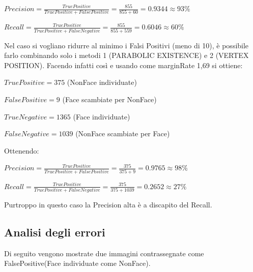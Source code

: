 \documentclass[
  italian,
]{article}
\begin{document}
\(Precision = \frac{TruePositive}{TruePositive + FalsePositive} = \frac{855}{855+60} = 0.9344 \approx 93\%\)

\(Recall = \frac{TruePositive}{TruePositive + FalseNegative} = \frac{855}{855+559} = 0.6046 \approx 60\%\)

\pagebreak

Nel caso si vogliano ridurre al minimo i Falsi Positivi (meno di 10), è possibile farlo combinando solo i metodi 1 (PARABOLIC EXISTENCE) e 2 (VERTEX POSITION).
Facendo infatti così e usando come marginRate 1,69 si ottiene:

\(True Positive = 375\) (NonFace individuate)

\(False Positive = 9\) (Face scambiate per NonFace)

\(True Negative = 1365\) (Face individuate)

\(False Negative = 1039\) (NonFace scambiate per Face)

Ottenendo:

\(Precision = \frac{TruePositive}{TruePositive + FalsePositive} = \frac{375}{375+9} = 0.9765 \approx 98\%\)

\(Recall = \frac{TruePositive}{TruePositive + FalseNegative} = \frac{375}{375+1039} = 0.2652 \approx 27\%\)

Purtroppo in questo caso la Precision alta è a discapito del Recall.

\hypertarget{Analisi degli errori}{%
\subsection{Analisi degli errori}\label{Analisi degli errori}}

Di seguito vengono mostrate due immagini contrassegnate come FalsePositive(Face individuate come NonFace).
\end{document}
